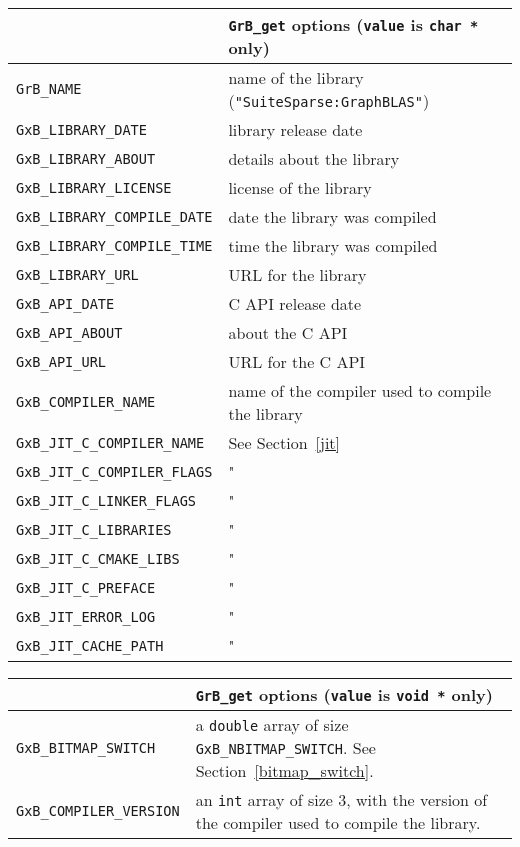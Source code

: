 \noindent
{\small
\begin{tabular}{p{2.2in}p{3.5in}}
\hline
                                    & \verb'GrB_get' options (\verb'value' is \verb'char *' only) \\
\hline
\verb'GrB_NAME'                     & name of the library (\verb'"SuiteSparse:GraphBLAS"') \\
\hline
\verb'GxB_LIBRARY_DATE'             & library release date \\
\verb'GxB_LIBRARY_ABOUT'            & details about the library \\
\verb'GxB_LIBRARY_LICENSE'          & license of the library \\
\verb'GxB_LIBRARY_COMPILE_DATE'     & date the library was compiled \\
\verb'GxB_LIBRARY_COMPILE_TIME'     & time the library was compiled \\
\verb'GxB_LIBRARY_URL'              & URL for the library \\
\verb'GxB_API_DATE'                 & C API release date \\
\verb'GxB_API_ABOUT'                & about the C API \\
\verb'GxB_API_URL'                  & URL for the C API \\
\verb'GxB_COMPILER_NAME'            & name of the compiler used to compile the library \\
\hline
\verb'GxB_JIT_C_COMPILER_NAME'      & See Section~\ref{jit} \\
\verb'GxB_JIT_C_COMPILER_FLAGS'     & " \\
\verb'GxB_JIT_C_LINKER_FLAGS'       & " \\
\verb'GxB_JIT_C_LIBRARIES'          & " \\
\verb'GxB_JIT_C_CMAKE_LIBS'         & " \\
\verb'GxB_JIT_C_PREFACE'            & " \\
\verb'GxB_JIT_ERROR_LOG'            & " \\
\verb'GxB_JIT_CACHE_PATH'           & " \\
\hline
\end{tabular}
}
\vspace{0.05in}

\noindent
{\small
\begin{tabular}{p{2.2in}p{3.5in}}
\hline
                                    & \verb'GrB_get' options (\verb'value' is \verb'void *' only) \\
\hline
\verb'GxB_BITMAP_SWITCH'            & a \verb'double' array of size \verb'GxB_NBITMAP_SWITCH'.
                                        See Section~\ref{bitmap_switch}. \\
\verb'GxB_COMPILER_VERSION'         & an \verb'int' array of size 3, with
                                        the version of the compiler used to
                                        compile the library. \\
\hline
\end{tabular}
}

